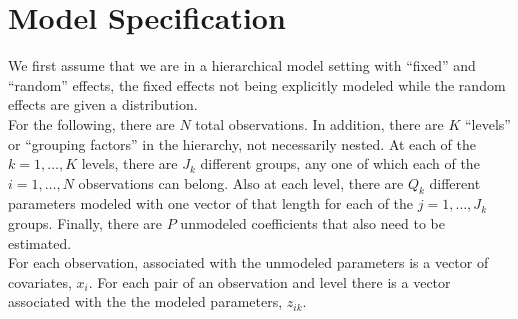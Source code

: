 \documentclass[10pt]{article}
\begin{document}
\normalem
\setlength{\parindent}{0pt}

\section*{Model Specification}

We first assume that we are in a hierarchical model setting with ``fixed''
and ``random'' effects, the fixed effects not being explicitly modeled
while the random effects are given a distribution. \\

For the following, there are $N$ total observations. In addition,
there are $K$ ``levels'' or ``grouping factors'' in the hierarchy, not necessarily
nested. At each of the $k=1,\ldots,K$ levels, there are $J_k$
different groups, any one of which each of the $i=1,\ldots,N$
observations can belong. Also at each level, there are $Q_k$
different parameters modeled with one vector of that length for
each of the $j=1,\ldots,J_k$ groups. Finally, there are $P$
unmodeled coefficients that also need to be estimated. \\

For each observation, associated with the unmodeled parameters is a
vector of covariates, $x_i$. For each pair of an observation and
level there is a vector associated with the the modeled parameters,
$z_{ik}$. \\
\end{document}
